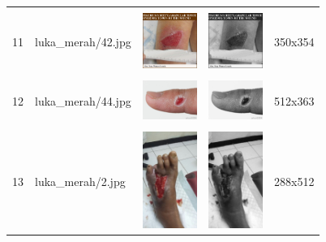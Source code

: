 \begin{table}[H]
\begin{tabular}{|m{0.2in}|m{1.2in}|m{0.7in}|m{0.7in}|m{0.7in}|}
		& &  &  &\\
		11& 
		luka\_merah/42.jpg &
		\includegraphics[width=0.7in]{dataset/dataset_3/luka_merah/ready/42.jpg}&
		\includegraphics[width=0.7in]{dataset/dataset_3/luka_merah/ready/42_gray.jpg}&
		350x354\\
		\hline
		
		& &  &  &\\
		12& 
		luka\_merah/44.jpg &
		\includegraphics[width=0.7in]{dataset/dataset_3/luka_merah/ready/44.jpg}&
		\includegraphics[width=0.7in]{dataset/dataset_3/luka_merah/ready/44_gray.jpg}&
		512x363\\
		\hline
		
		& &  &  &\\
		13& 
		luka\_merah/2.jpg &
		\includegraphics[width=0.7in]{dataset/dataset_3/luka_merah/ready/2.jpg}&
		\includegraphics[width=0.7in]{dataset/dataset_3/luka_merah/ready/2_gray.jpg}&
		288x512\\
		\hline
		

\end{tabular}
\end{table}

